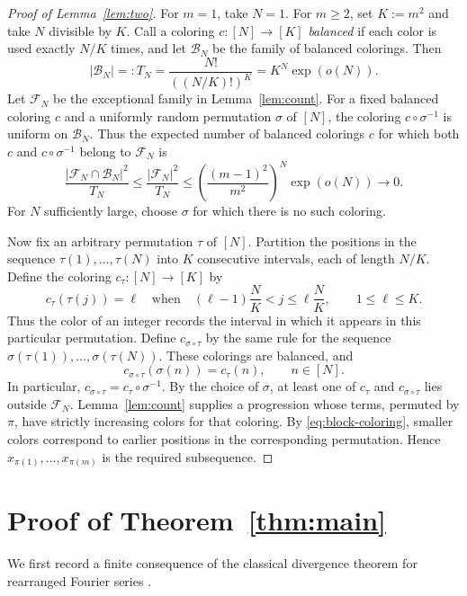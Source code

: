 \documentclass[11pt]{article}
\theoremstyle{remark}
\numberwithin{equation}{section}
\newcommand{\calF}{\mathcal F}
\newcommand{\calB}{\mathcal B}
\begin{document}
\begin{proof}[Proof of Lemma~\ref{lem:two}]
For $m=1$, take $N=1$. For $m\geq2$, set $K:=m^2$ and take $N$ divisible by $K$. Call a coloring $c:[N]\to[K]$ \emph{balanced} if each color is used exactly $N/K$ times, and let $\calB_N$ be the family of balanced colorings. Then
\[
 |\calB_N|=:T_N=\frac{N!}{((N/K)!)^K}=K^N\exp(o(N)).
\]
Let $\calF_N$ be the exceptional family in Lemma~\ref{lem:count}. For a fixed balanced coloring $c$ and a uniformly random permutation $\sigma$ of $[N]$, the coloring $c\circ\sigma^{-1}$ is uniform on $\calB_N$. Thus the expected number of balanced colorings $c$ for which both $c$ and $c\circ\sigma^{-1}$ belong to $\calF_N$ is
\[
 \frac{|\calF_N\cap\calB_N|^2}{T_N}
 \leq\frac{|\calF_N|^2}{T_N}
 \leq\left(\frac{(m-1)^2}{m^2}\right)^N\exp(o(N))\longrightarrow0.
\]
For $N$ sufficiently large, choose $\sigma$ for which there is no such coloring.

Now fix an arbitrary permutation $\tau$ of $[N]$. Partition the positions in the sequence $\tau(1),\ldots,\tau(N)$ into $K$ consecutive intervals, each of length $N/K$. Define the coloring $c_\tau:[N]\to[K]$ by
\begin{equation}\label{eq:block-coloring}
 c_\tau(\tau(j))=\ell
 \quad\text{when}\quad
 (\ell-1)\frac{N}{K}<j\leq\ell\frac{N}{K},
 \qquad 1\leq\ell\leq K.
\end{equation}
Thus the color of an integer records the interval in which it appears in this particular permutation. Define $c_{\sigma\circ\tau}$ by the same rule for the sequence $\sigma(\tau(1)),\ldots,\sigma(\tau(N))$. These colorings are balanced, and
\[
 c_{\sigma\circ\tau}(\sigma(n))=c_\tau(n),
 \qquad n\in[N].
\]
In particular, $c_{\sigma\circ\tau}=c_\tau\circ\sigma^{-1}$. By the choice of $\sigma$, at least one of $c_\tau$ and $c_{\sigma\circ\tau}$ lies outside $\calF_N$. Lemma~\ref{lem:count} supplies a progression whose terms, permuted by $\pi$, have strictly increasing colors for that coloring. By \eqref{eq:block-coloring}, smaller colors correspond to earlier positions in the corresponding permutation. Hence $x_{\pi(1)},\ldots,x_{\pi(m)}$ is the required subsequence.
\end{proof}

\section{Proof of Theorem~\ref{thm:main}}

We first record a finite consequence of the classical divergence theorem for rearranged Fourier series \cite{KolmogorovMenshov,Zahorski}.
\end{document}
